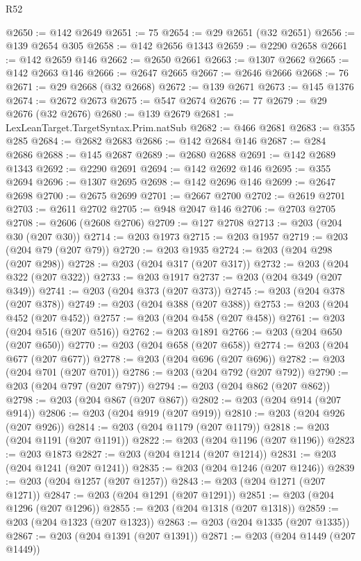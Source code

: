 \begin{lexlean}{R52}
\begin{coremodule}
@2650 := @142 @2649
@2651 := 75
@2654 := @29 @2651 (@32 @2651)
@2656 := @139 @2654 @305
@2658 := @142 @2656 @1343
@2659 := @2290 @2658
@2661 := @142 @2659 @146
@2662 := @2650 @2661
@2663 := @1307 @2662
@2665 := @142 @2663 @146
@2666 := @2647 @2665
@2667 := @2646 @2666
@2668 := 76
@2671 := @29 @2668 (@32 @2668)
@2672 := @139 @2671
@2673 := @145 @1376
@2674 := @2672 @2673
@2675 := @547 @2674
@2676 := 77
@2679 := @29 @2676 (@32 @2676)
@2680 := @139 @2679
@2681 := LexLeanTarget.TargetSyntax.Prim.natSub
@2682 := @466 @2681
@2683 := @355 @285
@2684 := @2682 @2683
@2686 := @142 @2684 @146
@2687 := @284 @2686
@2688 := @145 @2687
@2689 := @2680 @2688
@2691 := @142 @2689 @1343
@2692 := @2290 @2691
@2694 := @142 @2692 @146
@2695 := @355 @2694
@2696 := @1307 @2695
@2698 := @142 @2696 @146
@2699 := @2647 @2698
@2700 := @2675 @2699
@2701 := @2667 @2700
@2702 := @2619 @2701
@2703 := @2611 @2702
@2705 := @948 @2047 @146
@2706 := @2703 @2705
@2708 := @2606 (@2608 @2706)
@2709 := @127 @2708
@2713 := @203 (@204 @30 (@207 @30))
@2714 := @203 @1973
@2715 := @203 @1957
@2719 := @203 (@204 @79 (@207 @79))
@2720 := @203 @1935
@2724 := @203 (@204 @298 (@207 @298))
@2728 := @203 (@204 @317 (@207 @317))
@2732 := @203 (@204 @322 (@207 @322))
@2733 := @203 @1917
@2737 := @203 (@204 @349 (@207 @349))
@2741 := @203 (@204 @373 (@207 @373))
@2745 := @203 (@204 @378 (@207 @378))
@2749 := @203 (@204 @388 (@207 @388))
@2753 := @203 (@204 @452 (@207 @452))
@2757 := @203 (@204 @458 (@207 @458))
@2761 := @203 (@204 @516 (@207 @516))
@2762 := @203 @1891
@2766 := @203 (@204 @650 (@207 @650))
@2770 := @203 (@204 @658 (@207 @658))
@2774 := @203 (@204 @677 (@207 @677))
@2778 := @203 (@204 @696 (@207 @696))
@2782 := @203 (@204 @701 (@207 @701))
@2786 := @203 (@204 @792 (@207 @792))
@2790 := @203 (@204 @797 (@207 @797))
@2794 := @203 (@204 @862 (@207 @862))
@2798 := @203 (@204 @867 (@207 @867))
@2802 := @203 (@204 @914 (@207 @914))
@2806 := @203 (@204 @919 (@207 @919))
@2810 := @203 (@204 @926 (@207 @926))
@2814 := @203 (@204 @1179 (@207 @1179))
@2818 := @203 (@204 @1191 (@207 @1191))
@2822 := @203 (@204 @1196 (@207 @1196))
@2823 := @203 @1873
@2827 := @203 (@204 @1214 (@207 @1214))
@2831 := @203 (@204 @1241 (@207 @1241))
@2835 := @203 (@204 @1246 (@207 @1246))
@2839 := @203 (@204 @1257 (@207 @1257))
@2843 := @203 (@204 @1271 (@207 @1271))
@2847 := @203 (@204 @1291 (@207 @1291))
@2851 := @203 (@204 @1296 (@207 @1296))
@2855 := @203 (@204 @1318 (@207 @1318))
@2859 := @203 (@204 @1323 (@207 @1323))
@2863 := @203 (@204 @1335 (@207 @1335))
@2867 := @203 (@204 @1391 (@207 @1391))
@2871 := @203 (@204 @1449 (@207 @1449))

\end{coremodule}
\end{lexlean}
